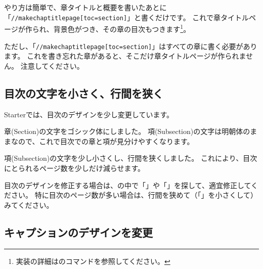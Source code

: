 やり方は簡単で、章タイトルと概要を書いたあとに「\texttt{//makechaptitlepage[toc=section]}」と書くだけです。
これで章タイトルページが作られ、背景色がつき、その章の目次もつきます\footnote{実装の詳細はのコマンドを参照してください。}。

\begin{starterprogram}\end{starterprogram}

ただし、「\texttt{//makechaptitlepage[toc=section]}」はすべての章に書く必要があります。
これを書き忘れた章があると、そこだけ章タイトルページが作られません。
注意してください。

\subsection*{目次の文字を小さく、行間を狭く}
\label{sec:1-2-10}

Starterでは、目次のデザインを少し変更しています。

\begin{starteritemize}
\item 章(Section)の文字をゴシック体にしました。
   項(Subsection)の文字は明朝体のままなので、これで目次での章と項が見分けやすくなります。
\item 項(Subsection)の文字を少し小さくし、行間を狭くしました。
   これにより、目次にとられるページ数を少しだけ減らせます。
\end{starteritemize}

目次のデザインを修正する場合は、の中で「」や「」を探して、適宜修正してください。
特に目次のページ数が多い場合は、行間を狭めて（「」を小さくして）みてください。

\subsection*{キャプションのデザインを変更}
\label{sec:1-2-11}

